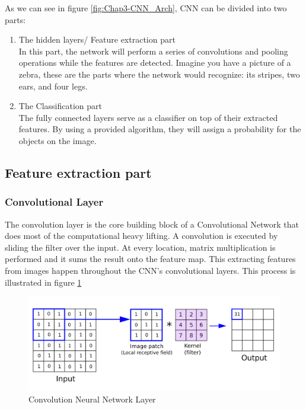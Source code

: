 As we can see in figure \ref{fig:Chap3-CNN_Arch}, CNN can be divided into two parts:
\begin{enumerate}
	\item The hidden layers/ Feature extraction part\\
	In this part, the network will perform a series of convolutions and pooling operations while the features are detected. Imagine you have a picture of a zebra, these are the parts where the
	network would recognize: its stripes, two ears, and four legs.
	\item The Classification part\\
	The fully connected layers serve as a classifier on top of their extracted features. By using a provided algorithm, they will assign a probability for the objects on the image.
\end{enumerate}

\subsection{Feature extraction part}
\subsubsection{Convolutional Layer}

The convolution layer is the core building block of a Convolutional Network that does most of the computational heavy lifting. A convolution is executed by sliding the filter over the input. At every location, matrix multiplication is performed and it sums the result onto the feature map. This extracting features from images happen throughout the CNN's convolutional layers. This process is illustrated in figure \ref{fig:Chap3-CNN_Layer}

\begin{figure}[H]
	\centering
	\includegraphics[width=\textwidth]{img/Chap3/ConvLayer}
	\caption{Convolution Neural Network Layer}
	\label{fig:Chap3-CNN_Layer}
\end{figure}

